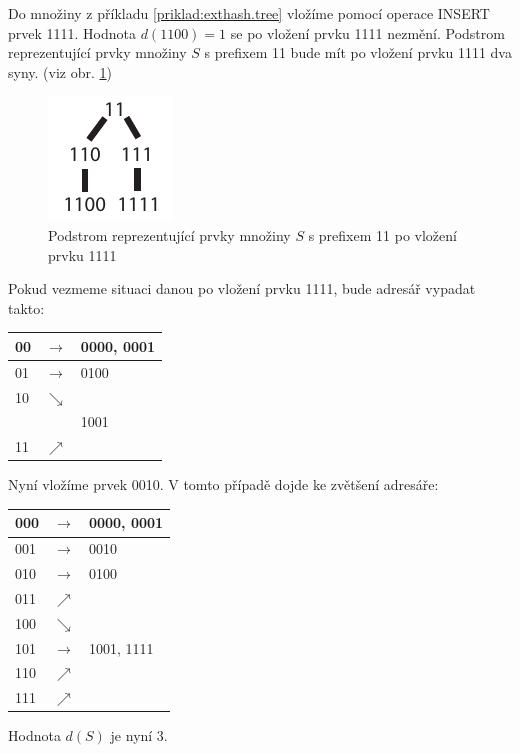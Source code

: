 \begin{priklad}
\label{priklad:exthash.insert2}
Do množiny z příkladu \ref{priklad:exthash.tree} vložíme pomocí operace
INSERT prvek 1111. Hodnota $d(1100) = 1$ se po vložení prvku 1111
nezmění. Podstrom reprezentující prvky množiny $S$ s prefixem 11
bude mít po vložení prvku 1111 dva syny. (viz obr.
\ref{fig.hash.extern.ins})

\begin{figure}[!htb]
\centering\includegraphics{pics/exthash-ins}
\caption{Podstrom reprezentující prvky množiny $S$ s prefixem 11 po
vložení prvku 1111}
\label{fig.hash.extern.ins}
\end{figure}

Pokud vezmeme situaci danou po vložení prvku 1111, bude adresář vypadat
takto:

\vspace{5mm}

\begin{tabular}{lll}
00 & $\rightarrow$ & 0000, 0001 \\
\hline
01 & $\rightarrow$ & 0100 \\
\hline
10 & $\searrow$ & 	 \\
  & &  1001 \\
11 & $\nearrow$	& \\
\end{tabular}

\vspace{5mm}

Nyní vložíme prvek 0010. V tomto případě dojde ke zvětšení adresáře:

\vspace{5mm}

\begin{tabular}{lll}
000 & $\rightarrow$ & 0000, 0001 \\
\hline
001 & $\rightarrow$ & 0010 \\
\hline
010 & $\rightarrow$ & 0100 \\
011 & $\nearrow$ & \\
\hline
100 & $\searrow$ & \\
101 & $\rightarrow$ &  1001, 1111 \\
110 & $\nearrow$ & \\
111 & $\nearrow$ & \\
\end{tabular}

\vspace{5mm}

Hodnota $d(S)$ je nyní 3.
\end{priklad}


